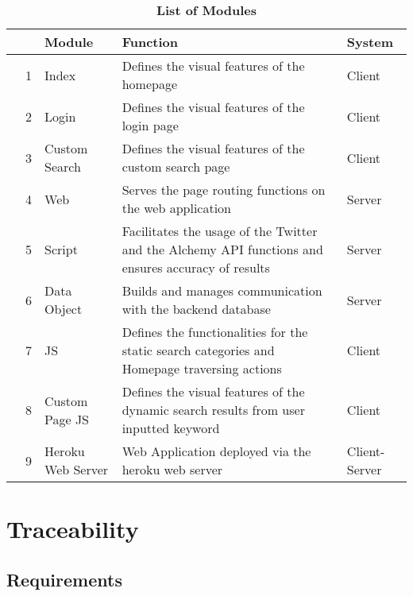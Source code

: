 \documentclass[12pt, titlepage]{article}
\begin{document}
\begin{table}[h]
\caption{\bf List of Modules} \label{tab:modules}
\begin{tabularx}{\textwidth}{p{0.2cm}p{0.1cm}p{3.5cm}p{6cm}X}
\toprule & {\bf} & {\bf Module} & {\bf Function} & {\bf System}\\
\midrule
&1 & Index & Defines the visual features of the homepage & Client\\ 
&2 & Login & Defines the visual features of the login page & Client\\
&3 & Custom Search  & Defines the visual features of the custom search page & Client\\
&4 & Web & Serves the page routing functions on the web application & Server \\
&5 & Script & Facilitates the usage of the Twitter and the Alchemy API functions and ensures accuracy of results& Server \\
&6 & Data Object  & Builds and manages communication with the backend database & Server \\
&7 & JS & Defines the functionalities for the static search categories and Homepage traversing actions & Client\\
&8 & Custom Page JS & Defines the visual features of the dynamic search results from user inputted keyword  & Client \\
&9 & Heroku Web Server & Web Application deployed via the heroku web server & Client-Server\\


\bottomrule
\end{tabularx}
\end{table}



\section{Traceability}
\subsection{Requirements}
\end{document}
